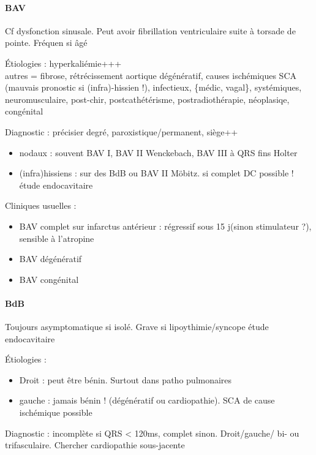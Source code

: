\paragraph{BAV}
Cf dysfonction sinusale. Peut avoir fibrillation ventriculaire suite à torsade
de pointe. Fréquen si âgé

Étiologies : hyperkaliémie+++ \\
autres = fibrose, rétrécissement aortique dégénératif, causes ischémiques
SCA (mauvais pronostic si (infra)-hissien !), infectieux, \{médic, vagal\},
systémiques, neuromusculaire, post-chir, postcathétérisme, postradiothérapie,
néoplasiqe, congénital

Diagnostic : précisier degré, paroxistique/permanent, siège++ 
\begin{itemize}
  \item nodaux : souvent BAV I, BAV II Wenckebach, BAV III à QRS fins \thus
    Holter
  \item (infra)hissiens : sur des BdB ou BAV II Möbitz. \skull si complet DC
    possible !\\
    \thus étude endocavitaire
\end{itemize}

Cliniques usuelles :
\begin{itemize}
  \item BAV complet sur infarctus antérieur : régressif sous 15 j(sinon stimulateur ?),
    sensible à l'atropine
  \item BAV dégénératif
  \item BAV congénital
\end{itemize}

\paragraph{BdB}
Toujours asymptomatique si isolé. Grave si lipoythimie/syncope \danger \thus
étude endocavitaire

Étiologies :
\begin{itemize}
  \item Droit : peut être bénin. Surtout dans patho pulmonaires
  \item gauche : jamais bénin ! (dégénératif ou cardiopathie). SCA de cause
    ischémique possible \skull
\end{itemize}

Diagnostic : incomplète si QRS < 120ms, complet sinon. Droit/gauche/ bi- ou
trifasculaire. Chercher cardiopathie sous-jacente

